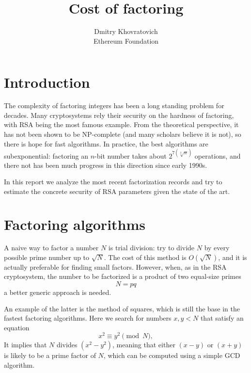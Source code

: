 \documentclass[a4paper]{article}
\title{Cost of factoring}
\author{Dmitry Khovratovich\\Ethereum Foundation}
\begin{document}
\maketitle

\section{Introduction}

The complexity of factoring integers has been a long standing problem for decades. Many cryptosystems rely their security on the hardness of factoring, with RSA being the most famous example. From the theoretical perspective, it has not been shown to be NP-complete (and many scholars believe it is not), so there is hope for fast algorithms. In practice, the best algorithms are subexponential: factoring an $n$-bit number takes about $2^{7(\sqrt[3]{n})}$ operations, and there not has been much progress in this direction since early 1990s.

In this report we analyze the most recent factorization records and try to estimate the concrete security of RSA parameters given the state of the art.


\section{Factoring algorithms}

A naive way to factor a number $N$ is trial division: try to divide $N$ by every possible prime number up to $\sqrt{N}$. The cost of this method is $O(\sqrt{N})$, and it is actually preferable for finding small factors. However, when, as in the RSA cryptosystem, the number to be factorized is a product of two equal-size primes
$$
N = pq
$$
a better generic approach is needed.

An example of the latter is the method of squares, which is still the base in the fastest factoring algorithms. Here we search for numbers $x,y <N$ that satisfy an equation
\begin{equation}\label{eq:square}
x^2 \equiv y^2 \pmod{N},
\end{equation}
It implies that $N$ divides $(x^2-y^2)$, meaning that  either $(x-y)$ or $(x+y)$ is likely to be a prime factor of $N$, which can be computed using a simple GCD algorithm. 
\end{document}
